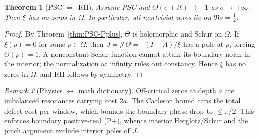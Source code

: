 \documentclass[11pt]{article}
\newtheorem{theorem}{Theorem}
\theoremstyle{remark}
\newtheorem{remark}[theorem]{Remark}
\DeclareMathOperator{\dettwo}{det_2}
\begin{document}
\begin{theorem}[PSC \(\Rightarrow\) RH]\label{thm:PSC-RH}
Assume PSC and \(\Theta(\sigma+it)\to -1\) as \(\sigma\to+\infty\). Then \(\xi\) has no zeros in \(\Omega\). In particular, all nontrivial zeros lie on \(\Re s=\tfrac12\).
\end{theorem}
\begin{proof}
By Theorem~\ref{thm:PSC-Pplus}, \(\Theta\) is holomorphic and Schur on \(\Omega\).
If \(\xi(\rho)=0\) for some \(\rho\in\Omega\), then \(J=\mathcal J\,\mathcal O=\dettwo(I-A)/\xi\) has a pole at \(\rho\), forcing \(\Theta(\rho)=1\). A nonconstant Schur function cannot attain its boundary norm in the interior; the normalization at infinity rules out constancy. Hence \(\xi\) has no zeros in \(\Omega\), and RH follows by symmetry.
\end{proof}

\begin{remark}[Physics $\leftrightarrow$ math dictionary]
Off-critical zeros at depth \(a\) are imbalanced resonances carrying cost \(2a\). The Carleson bound caps the total defect cost per window, which bounds the boundary phase drop to \(\le\pi/2\). This enforces boundary positive-real (P+), whence interior Herglotz/Schur and the pinch argument exclude interior poles of \(J\).
\end{remark}
\end{document}
